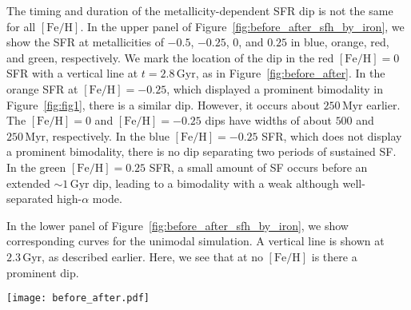 \documentclass[twocolumn,linenumbers,trackchanges]{aastex631}
\newcommand{\Gyr}{\ensuremath{\textrm{Gyr}}}
\newcommand{\Myr}{\ensuremath{\textrm{Myr}}}
\newcommand{\FeH}{\ensuremath{[\textrm{Fe}/\textrm{H}]}}
\newcommand{\dex}{\ensuremath{\textrm{dex}}}
\begin{document}
The timing and duration of the metallicity-dependent SFR dip is not the same for all \FeH{}. In the upper panel of Figure~\ref{fig:before_after_sfh_by_iron}, we show the SFR at metallicities of $-0.5$, $-0.25$, $0$, and $0.25$ in blue, orange, red, and green, respectively. We mark the location of the dip in the red $\FeH=0$ SFR with a vertical line at $t=2.8\,\Gyr$, as in Figure~\ref{fig:before_after}. In the orange SFR at $\FeH=-0.25$, which displayed a prominent bimodality in Figure~\ref{fig:fig1}, there is a similar dip. However, it occurs about $250\,\Myr$ earlier. The $\FeH=0$ and $\FeH=-0.25$ dips have widths of about $500$ and $250\,\Myr$, respectively. In the blue $\FeH=-0.25$ SFR, which does not display a prominent bimodality, there is no dip separating two periods of sustained SF. In the green $\FeH=0.25$ SFR, a small amount of SF occurs before an extended $\sim1\,\Gyr$ dip, leading to a bimodality with a weak although well-separated high-$\alpha$ mode.

In the lower panel of Figure~\ref{fig:before_after_sfh_by_iron}, we show corresponding curves for the unimodal simulation. A vertical line is shown at $2.3\,\Gyr$, as described earlier. Here, we see that at no \FeH{} is there a prominent dip.

\begin{figure*}
  \centering
  \texttt{[image: before\_after.pdf]}
  \caption{The buildup of the abundance plane in the bimodal simulation. The left panel shows the metallicity-dependent star formation rate (SFR) for star particles in the solar neighborhood at the end of the simulation, selected within a $0.1\,\dex$ bin centered at $\FeH=0$. A clear dip in this SFR occurs at $t \sim 2.8\,\Gyr$, marked by the vertical line. The center-left panel shows the abundance plane distribution for all stars in the solar neighborhood, with a dashed line at $-0.1\times\FeH+0.3$ (chosen by eye) demarcating the high- and low-$\alpha$ sequences. The center-right and right panels show the abundance plane distributions for stars formed before and after the SFR dip, respectively. The majority of the high-$\alpha$ sequence forms before the dip, while most of the low-$\alpha$ sequence forms afterward.}
  \label{fig:before_after}
\end{figure*}
\end{document}
